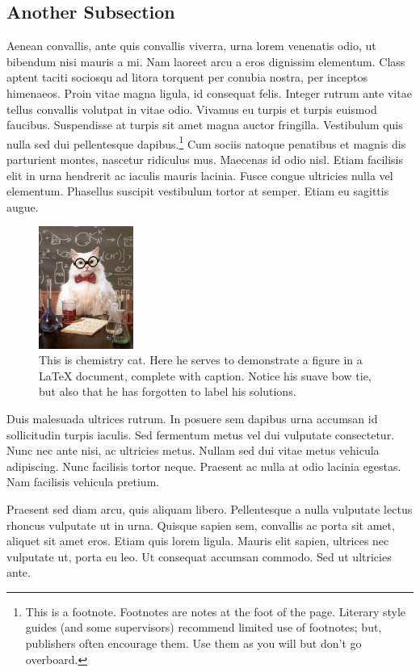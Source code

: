 \subsection{Another Subsection}
Aenean convallis, ante quis convallis viverra, urna lorem venenatis odio, ut bibendum nisi mauris a mi. Nam laoreet arcu a eros dignissim elementum. Class aptent taciti sociosqu ad litora torquent per conubia nostra, per inceptos himenaeos. Proin vitae magna ligula, id consequat felis. Integer rutrum ante vitae tellus convallis volutpat in vitae odio. Vivamus eu turpis et turpis euismod faucibus. Suspendisse at turpis sit amet magna auctor fringilla. Vestibulum quis nulla sed dui pellentesque dapibus.\footnote{This is a footnote. Footnotes are notes at the foot of the page. Literary style guides (and some supervisors) recommend limited use of footnotes; but, publishers often encourage them. Use them as you will but don't go overboard.} Cum sociis natoque penatibus et magnis dis parturient montes, nascetur ridiculus mus. Maecenas id odio nisl. Etiam facilisis elit in urna hendrerit ac iaculis mauris lacinia. Fusce congue ultricies nulla vel elementum. Phasellus suscipit vestibulum tortor at semper. Etiam eu sagittis augue.\cite{bioluminescence,clayden_orgchem}
\begin{figure}
\centering
\includegraphics[height=4cm]{figures/example.jpg}
\caption[Chemistry cat.]{This is chemistry cat. Here he serves to demonstrate a figure in a LaTeX document, complete with caption. Notice his suave bow tie, but also that he has forgotten to label his solutions.}
\end{figure}
Duis malesuada ultrices rutrum. In posuere sem dapibus urna accumsan id sollicitudin turpis iaculis. Sed fermentum metus vel dui vulputate consectetur. Nunc nec ante nisi, ac ultricies metus. Nullam sed dui vitae metus vehicula adipiscing. Nunc facilisis tortor neque. Praesent ac nulla at odio lacinia egestas. Nam facilisis vehicula pretium.

Praesent sed diam arcu, quis aliquam libero. Pellentesque a nulla vulputate lectus rhoncus vulputate ut in urna. Quisque sapien sem, convallis ac porta sit amet, aliquet sit amet eros. Etiam quis lorem ligula. Mauris elit sapien, ultrices nec vulputate ut, porta eu leo. Ut consequat accumsan commodo. Sed ut ultricies ante.